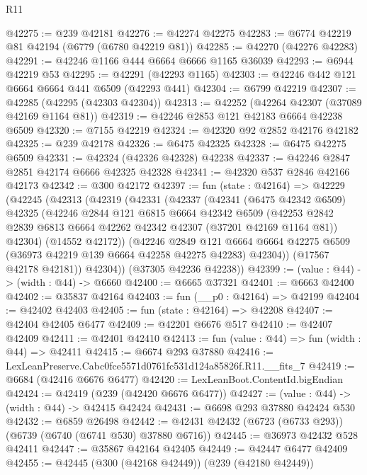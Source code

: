 \begin{lexlean}{R11}
\begin{coremodule}
@42275 := @239 @42181
@42276 := @42274 @42275
@42283 := @6774 @42219 @81 @42194 (@6779 (@6780 @42219 @81))
@42285 := @42270 (@42276 @42283)
@42291 := @42246 @1166 @444 @6664 @6666 @1165 @36039
@42293 := @6944 @42219 @53
@42295 := @42291 (@42293 @1165)
@42303 := @42246 @442 @121 @6664 @6664 @441 @6509 (@42293 @441)
@42304 := @6799 @42219
@42307 := @42285 (@42295 (@42303 @42304))
@42313 := @42252 (@42264 @42307 (@37089 @42169 @1164 @81))
@42319 := @42246 @2853 @121 @42183 @6664 @42238 @6509
@42320 := @7155 @42219
@42324 := @42320 @92 @2852 @42176 @42182
@42325 := @239 @42178
@42326 := @6475 @42325
@42328 := @6475 @42275 @6509
@42331 := @42324 (@42326 @42328) @42238
@42337 := @42246 @2847 @2851 @42174 @6666 @42325 @42328
@42341 := @42320 @537 @2846 @42166 @42173
@42342 := @300 @42172
@42397 := fun (state : @42164) =>
  @42229
    (@42245
      (@42313
        (@42319
          (@42331
            (@42337
              (@42341
                (@6475 @42342 @6509)
                @42325
                (@42246
                  @2844
                  @121
                  @6815
                  @6664
                  @42342
                  @6509
                  (@42253 @2842 @2839 @6813 @6664 @42262 @42342 @42307 (@37201 @42169 @1164 @81))
                  @42304)
                (@14552 @42172))
              (@42246
                @2849
                @121
                @6664
                @6664
                @42275
                @6509
                (@36973 @42219 @139 @6664 @42258 @42275 @42283)
                @42304))
            (@17567 @42178 @42181))
          @42304))
      (@37305 @42236 @42238))
@42399 := (value : @44) -> (width : @44) -> @6660
@42400 := @6665 @37321
@42401 := @6663 @42400
@42402 := @35837 @42164
@42403 := fun (__p0 : @42164) => @42199
@42404 := @42402 @42403
@42405 := fun (state : @42164) => @42208
@42407 := @42404 @42405 @6477
@42409 := @42201 @6676 @517
@42410 := @42407 @42409
@42411 := @42401 @42410
@42413 := fun (value : @44) => fun (width : @44) => @42411
@42415 := @6674 @293 @37880
@42416 := LexLeanPreserve.Cabc0fce5571d0761fc531d124a85826f.R11.__fits_7
@42419 := @6684 (@42416 @6676 @6477)
@42420 := LexLeanBoot.ContentId.bigEndian
@42424 := @42419 (@239 (@42420 @6676 @6477))
@42427 := (value : @44) -> (width : @44) -> @42415 @42424
@42431 := @6698 @293 @37880 @42424 @530
@42432 := @6859 @26498
@42442 := @42431 @42432 (@6723 (@6733 @293)) (@6739 (@6740 (@6741 @530) @37880 @6716))
@42445 := @36973 @42432 @528 @42411
@42447 := @35867 @42164 @42405
@42449 := @42447 @6477 @42409
@42455 := @42445 (@300 (@42168 @42449)) (@239 (@42180 @42449))

\end{coremodule}
\end{lexlean}
